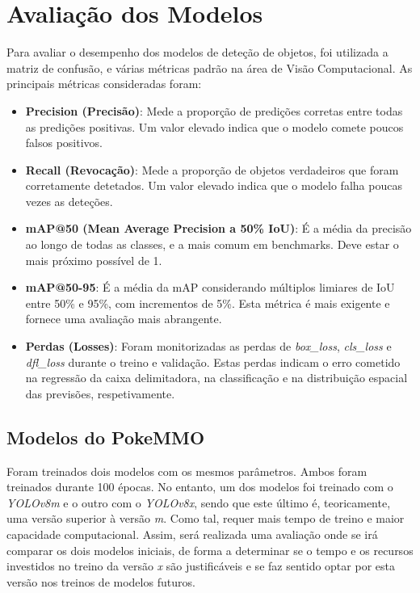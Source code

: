 \section{Avaliação dos Modelos} \label{avaliacoes_dos_modelos}
Para avaliar o desempenho dos modelos de deteção de objetos, foi utilizada a matriz de confusão, e várias métricas padrão na área de Visão Computacional. As principais métricas consideradas foram:

\begin{itemize}
    \item \textbf{Precision (Precisão)}: Mede a proporção de predições corretas entre todas as predições positivas. Um valor elevado indica que o modelo comete poucos falsos positivos.
    
    \item \textbf{Recall (Revocação)}: Mede a proporção de objetos verdadeiros que foram corretamente detetados. Um valor elevado indica que o modelo falha poucas vezes as deteções.
    
    \item \textbf{mAP@50 (Mean Average Precision a 50\% IoU)}: É a média da precisão ao longo de todas as classes, e a mais comum em benchmarks. Deve estar o mais próximo possível de 1.
    
    \item \textbf{mAP@50-95}: É a média da mAP considerando múltiplos limiares de IoU entre 50\% e 95\%, com incrementos de 5\%. Esta métrica é mais exigente e fornece uma avaliação mais abrangente.
    
    \item \textbf{Perdas (Losses)}: Foram monitorizadas as perdas de \textit{box\_loss}, \textit{cls\_loss} e \textit{dfl\_loss} durante o treino e validação. Estas perdas indicam o erro cometido na regressão da caixa delimitadora, na classificação e na distribuição espacial das previsões, respetivamente.
\end{itemize}

%
%
\subsection{Modelos do PokeMMO}
Foram treinados dois modelos com os mesmos parâmetros. Ambos foram treinados durante 100 épocas. No entanto, um dos modelos foi treinado com o \textit{YOLOv8m} e o outro com o \textit{YOLOv8x}, sendo que este último é, teoricamente, uma versão superior à versão \textit{m}. Como tal, requer mais tempo de treino e maior capacidade computacional. Assim, será realizada uma avaliação onde se irá comparar os dois modelos iniciais, de forma a determinar se o tempo e os recursos investidos no treino da versão \textit{x} são justificáveis e se faz sentido optar por esta versão nos treinos de modelos futuros.

